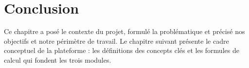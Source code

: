 \section{Conclusion}
Ce chapitre a posé le contexte du projet, formulé la problématique et précisé nos objectifs et notre périmètre de travail. Le chapitre suivant présente le cadre conceptuel de la plateforme : les définitions des concepts clés et les formules de calcul qui fondent les trois modules.